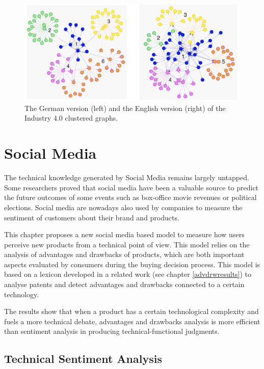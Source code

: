 \documentclass[b5paper,]{book}
\theoremstyle{definition}
\theoremstyle{definition}
\theoremstyle{definition}
\theoremstyle{remark}
\begin{document}
\begin{figure}

{\centering \includegraphics[width=1\linewidth]{_bookdown_files/figures/industrie_clusters} 

}

\caption{The German version (left) and the English version (right) of the Industry 4.0 clustered graphs.}\label{fig:industrieclusters}
\end{figure}

\chapter{Social Media}\label{social-media}

The technical knowledge generated by Social Media remains largely
untapped. Some researchers proved that social media have been a valuable
source to predict the future outcomes of some events such as box-office
movie revenues or political elections. Social media are nowadays also
used by companies to measure the sentiment of customers about their
brand and products.

This chapter proposes a new social media based model to measure how
users perceive new products from a technical point of view. This model
relies on the analysis of advantages and drawbacks of products, which
are both important aspects evaluated by consumers during the buying
decision process. This model is based on a lexicon developed in a
related work (see chapter \ref{advdrwresults}) to analyse patents and
detect advantages and drawbacks connected to a certain technology.

The results show that when a product has a certain technological
complexity and fuels a more technical debate, advantages and drawbacks
analysis is more efficient than sentiment analysis in producing
technical-functional judgments.

\section{Technical Sentiment Analysis}\label{techsentanal}
\end{document}
